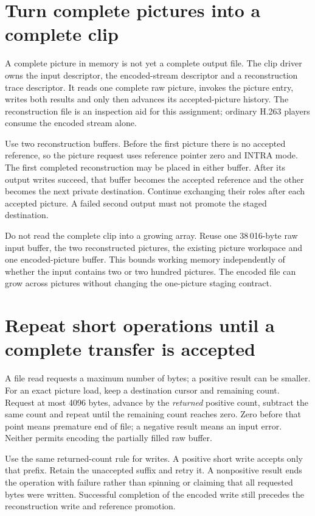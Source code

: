 \section{Turn complete pictures into a complete clip}
A complete picture in memory is not yet a complete output file. The clip driver
owns the input descriptor, the encoded-stream descriptor and a reconstruction
trace descriptor. It reads one complete raw picture, invokes the picture entry,
writes both results and only then advances its accepted-picture history.
The reconstruction file is an inspection aid for this assignment; ordinary H.263
players consume the encoded stream alone.

Use two reconstruction buffers. Before the first picture there is no accepted
reference, so the picture request uses reference pointer zero and INTRA mode.
The first completed reconstruction may be placed in either buffer. After its
output writes succeed, that buffer becomes the accepted reference and the other
becomes the next private destination. Continue exchanging their roles after each
accepted picture. A failed second output must not promote the staged destination.

Do not read the complete clip into a growing array. Reuse one 38\,016-byte raw
input buffer, the two reconstructed pictures, the existing picture workspace
and one encoded-picture buffer. This bounds working memory independently of
whether the input contains two or two hundred pictures. The encoded file can
grow across pictures without changing the one-picture staging contract.

\section{Repeat short operations until a complete transfer is accepted}
A file read requests a maximum number of bytes; a positive result can be smaller.
For an exact picture load, keep a destination cursor and remaining count. Request
at most 4096 bytes, advance by the \emph{returned} positive count, subtract the
same count and repeat until the remaining count reaches zero. Zero before that
point means premature end of file; a negative result means an input error.
Neither permits encoding the partially filled raw buffer.

Use the same returned-count rule for writes. A positive short write accepts
only that prefix. Retain the unaccepted suffix and retry it. A nonpositive result
ends the operation with failure rather than spinning or claiming that all requested
bytes were written. Successful completion of the encoded write still precedes
the reconstruction write and reference promotion.

